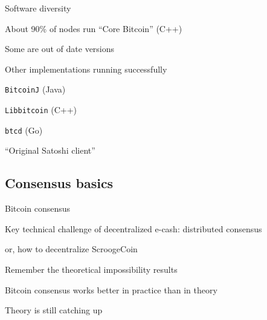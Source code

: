 \begin{frame}{Software diversity}

\BI
\item About 90\% of nodes run “Core Bitcoin” (C++)
	\BI
	\item Some are out of date versions
	\EI
\item Other implementations running successfully
	\BI
	\item \texttt{BitcoinJ} (Java)
	\item \texttt{Libbitcoin} (C++)
	\item \texttt{btcd} (Go)
	\EI
\item “Original Satoshi client”
\EI

\end{frame}


\subsection{Consensus basics}

\begin{frame}{Bitcoin consensus}


\BI
\item Key technical challenge of decentralized e-cash: \alert{distributed consensus} 
\item or, how to decentralize ScroogeCoin
\EI


\BI
\item Remember the theoretical impossibility results
\item Bitcoin consensus works better in practice than in theory
\item Theory is still catching up
\EI
	
\end{frame}





